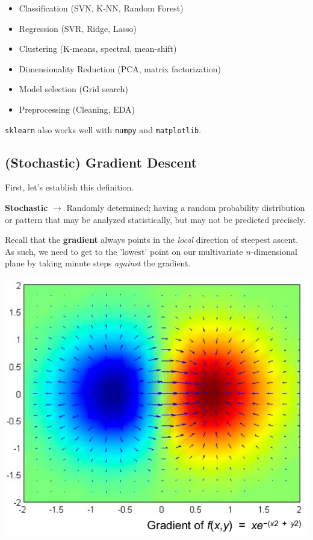 \documentclass[english, 10pt]{article}
\begin{document}
\begin{itemize}
	\item Classification (SVN, K-NN, Random Forest)
	\item Regression (SVR, Ridge, Lasso)
	\item Clustering (K-means, spectral, mean-shift)
	\item Dimensionality Reduction (PCA, matrix factorization)
	\item Model selection (Grid search)
	\item Preprocessing (Cleaning, EDA)
\end{itemize}

\texttt{sklearn} also works well with \texttt{numpy} and \texttt{matplotlib}.

\subsection{(Stochastic) Gradient Descent}

First, let's establish this definition.\\

\begin{tcolorbox}[title=Definition:,colframe=red!75!black,colback=red!5!white,arc=0pt,fonttitle=\bfseries]
\textbf{Stochastic} $\rightarrow$ Randomly determined; having a random probability distribution or pattern that may be analyzed statistically, but may not be predicted precisely.
\end{tcolorbox}

\hfill \break Recall that the \textbf{gradient} always points in the \textit{local} direction of steepest ascent.\\

As such, we need to get to the 'lowest' point on our multivariate $n$-dimensional plane by taking minute steps \textit{against} the gradient.

\begin{center}
	\includegraphics[scale=0.35]{img/gradient.png} 
\end{center}
\end{document}
